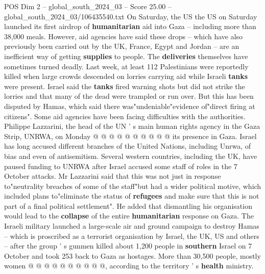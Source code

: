 \begin{textsample}{POS Dim 2 – global\_south\_2024\_03 – Score 25.00 – global\_south\_2024\_03/106435540.txt}
On Saturday, the US the US on Saturday launched its first airdrop of \textbf{humanitarian} aid into Gaza -- including more than 38,000 meals.
However, aid agencies have said these drops -- which have also previously been carried out by the UK, France, Egypt and Jordan -- are an inefficient way of getting \textbf{supplies} to people.
The \textbf{deliveries} themselves have sometimes turned deadly.
Last week, at least 112 Palestinians were reportedly killed when large crowds descended on lorries carrying aid while Israeli \textbf{tanks} were present.
Israel said the \textbf{tanks} fired warning shots but did not strike the lorries and that many of the dead were trampled or run over.
But this has been disputed by Hamas, which said there was"undeniable"evidence of"direct firing at citizens".
Some aid agencies have been facing difficulties with the authorities.
Philippe Lazzarini, the head of the UN ' s main human rights agency in the Gaza Strip, UNRWA, on Monday @ @ @ @ @ @ @ @ @ @ its presence in Gaza.
Israel has long accused different branches of the United Nations, including Unrwa, of bias and even of antisemitism.
Several western countries, including the UK, have paused funding to UNRWA after Israel accused some staff of roles in the 7 October attacks.
Mr Lazzarini said that this was not just in response to"neutrality breaches of some of the staff"but had a wider political motive, which included plans to"eliminate the status of \textbf{refugees} and make sure that this is not part of a final political settlement".
He added that dismantling his organisation would lead to the \textbf{collapse} of the entire \textbf{humanitarian} response on Gaza.
The Israeli military launched a large-scale air and ground campaign to destroy Hamas -- which is proscribed as a terrorist organisation by Israel, the UK, US and others -- after the group ' s gunmen killed about 1,200 people in \textbf{southern} Israel on 7 October and took 253 back to Gaza as hostages.
More than 30,500 people, mostly women @ @ @ @ @ @ @ @ @ @, according to the territory ' s \textbf{health} ministry.

\end{textsample}
